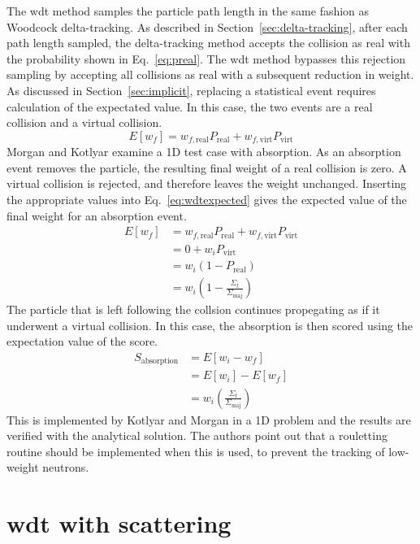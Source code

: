 The \gls{wdt} method samples the particle path length in the same fashion as
Woodcock delta-tracking. As described in Section~\ref{sec:delta-tracking},
after each path length sampled, the delta-tracking method accepts the
collision as real with the probability shown in
Eq.~\ref{eq:preal}. The \gls{wdt} method bypasses this rejection sampling by
accepting all collisions as real with a subsequent reduction in
weight. As discussed in Section~\ref{sec:implicit}, replacing a
statistical event requires calculation of the expectated value. In
this case, the two events are a real collision and a virtual
collision.
\begin{equation}
  \label{eq:wdtexpected}
  E[w_f] = w_{f,\mathrm{real}}P_{\mathrm{real}} + w_{f,\mathrm{virt}}P_{\mathrm{virt}}
\end{equation}
Morgan and Kotlyar examine a 1D test case with absorption. As an
absorption event removes the particle, the resulting final weight of a
real collision is zero. A virtual collision is rejected, and therefore
leaves the weight unchanged. Inserting the appropriate values into
Eq.~\eqref{eq:wdtexpected} gives the expected value of the final
weight for an absorption event.
\begin{align*}
  \label{eq:mkexpected}
  E[w_f] &= w_{f,\mathrm{real}}P_{\mathrm{real}} +
           w_{f,\mathrm{virt}}P_{\mathrm{virt}} \\
  &= 0 + w_iP_{\mathrm{virt}} \\
  &= w_i(1-P_\mathrm{real}) \\
  &= w_i\left(1-\frac{\Sigma_t}{\Sigma_\mathrm{maj}}\right)
\end{align*}
The particle that is left following the collsion continues propegating
as if it underwent a virtual collision. In this case, the absorption
is then scored using the expectation value of the score.
\begin{align*}
  S_\mathrm{absorption} &= E[w_i - w_f] \\
  &= E[w_i] - E[w_f] \\
  &= w_i\left(\frac{\Sigma_t}{\Sigma_\mathrm{maj}}\right)
\end{align*}
This is implemented by Kotlyar and Morgan in a 1D problem and the
results are verified with the analytical solution. The authors point
out that a rouletting routine should be implemented when this is used,
to prevent the tracking of low-weight neutrons.

\section{\Acrlong{wdt} with scattering}
\label{sec:wdt_scattering}


